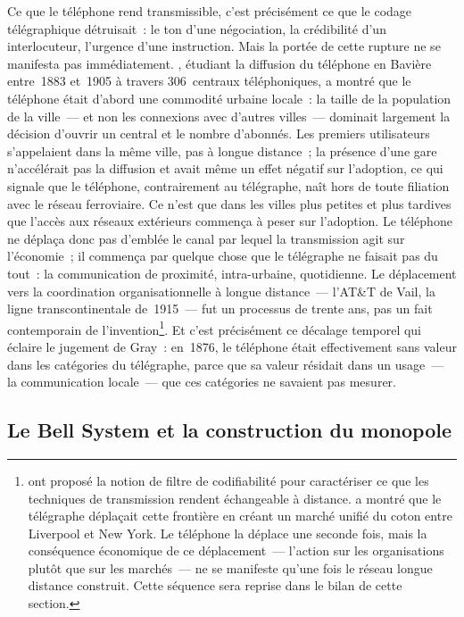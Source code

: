%
Ce que le téléphone rend transmissible, c'est précisément ce que le codage télégraphique détruisait~: le ton d'une négociation, la crédibilité d'un interlocuteur, l'urgence d'une instruction. Mais la portée de cette rupture ne se manifesta pas immédiatement. \textcite{ploeckl_market_2023}, étudiant la diffusion du téléphone en Bavière entre~1883 et~1905 à travers 306~centraux téléphoniques, a montré que le téléphone était d'abord une commodité urbaine locale~: la taille de la population de la ville~--- et non les connexions avec d'autres villes~--- dominait largement la décision d'ouvrir un central et le nombre d'abonnés. Les premiers utilisateurs s'appelaient dans la même ville, pas à longue distance~; la présence d'une gare n'accélérait pas la diffusion et avait même un effet négatif sur l'adoption, ce qui signale que le téléphone, contrairement au télégraphe, naît hors de toute filiation avec le réseau ferroviaire. Ce n'est que dans les villes plus petites et plus tardives que l'accès aux réseaux extérieurs commença à peser sur l'adoption. Le téléphone ne déplaça donc pas d'emblée le canal par lequel la transmission agit sur l'économie~; il commença par quelque chose que le télégraphe ne faisait pas du tout~: la communication de proximité, intra-urbaine, quotidienne. Le déplacement vers la coordination organisationnelle à longue distance~--- l'AT\&T de Vail, la ligne transcontinentale de~1915~--- fut un processus de trente ans, pas un fait contemporain de l'invention\footnote{\textcite{juhasz_spinning_2018} ont proposé la notion de filtre de codifiabilité pour caractériser ce que les techniques de transmission rendent échangeable à distance. \textcite{steinwender_real_2018} a montré que le télégraphe déplaçait cette frontière en créant un marché unifié du coton entre Liverpool et New York. Le téléphone la déplace une seconde fois, mais la conséquence économique de ce déplacement~--- l'action sur les organisations plutôt que sur les marchés~--- ne se manifeste qu'une fois le réseau longue distance construit. Cette séquence sera reprise dans le bilan de cette section.}. Et c'est précisément ce décalage temporel qui éclaire le jugement de Gray~: en~1876, le téléphone était effectivement sans valeur dans les catégories du télégraphe, parce que sa valeur résidait dans un usage~--- la communication locale~--- que ces catégories ne savaient pas mesurer.


\subsection{Le Bell System et la construction du monopole}\label{subsec:bell_system}

